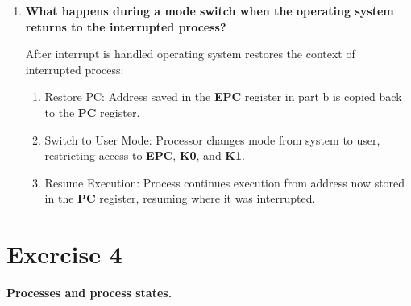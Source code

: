 \documentclass{article}
\newcommand{\exercise}[1]{
    \section*{Exercise #1}
    \markboth{Exercise #1}{}
}
\begin{document}
\begin{enumerate}[label=\textbf{\alph*})]
    \item \textbf{What happens during a mode switch when the operating system returns to the interrupted process?}

    After interrupt is handled operating system restores the context of
    interrupted process:
    \begin{enumerate}
        \item Restore PC: Address saved in the \textbf{EPC} register in part b
        is copied back to the \textbf{PC} register.
        \item Switch to User Mode: Processor changes mode from system to user, restricting access to \textbf{EPC}, \textbf{K0}, and \textbf{K1}.
        \item Resume Execution: Process continues execution from  address now stored in the \textbf{PC} register, resuming where it was interrupted.
    \end{enumerate}
\end{enumerate}

\newpage
\exercise{4}
\textbf{Processes and process states.}
\end{document}
